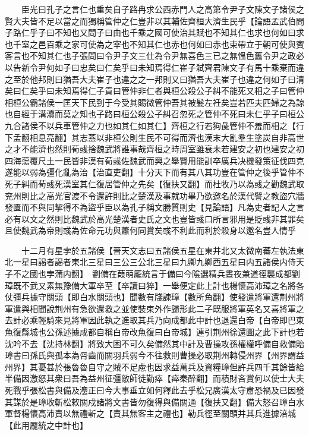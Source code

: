 　　臣光曰孔子之言仁也重矣自子路冉求公西赤門人之高第令尹子文陳文子諸侯之賢大夫皆不足以當之而獨稱管仲之仁豈非以其輔佐齊桓大濟生民乎【論語孟武伯問子路仁乎子曰不知也又問子曰由也千乘之國可使治其賦也不知其仁也求也何如曰求也千室之邑百乘之家可使為之宰也不知其仁也赤也何如曰赤也束帶立于朝可使與賓客言也不知其仁也子張問曰令尹子文三仕為令尹無喜色三已之無慍色舊令尹之政必以告新令尹何如子曰忠矣曰仁矣乎曰未知焉得仁崔子弑齊君陳文子有馬十乘棄而違之至於他邦則曰猶吾大夫崔子也違之之一邦則又曰猶吾大夫崔子也違之何如子曰清矣曰仁矣乎曰未知焉得仁子貢曰管仲非仁者與桓公殺公子糾不能死又相之子曰管仲相桓公霸諸侯一匡天下民到于今受其賜微管仲吾其被髪左衽矣豈若匹夫匹婦之為諒也自經于溝瀆而莫之知也子路曰桓公殺公子糾召忽死之管仲不死曰未仁乎子曰桓公九合諸侯不以兵車管仲之力也如其仁如其仁】齊桓之行若狗彘管仲不羞而相之【行下孟翻相息亮翻】其志蓋以非桓公則生民不可得而濟也漢末大亂羣生塗炭自非高世之才不能濟也然則荀彧捨魏武將誰事哉齊桓之時周室雖衰未若建安之初也建安之初四海蕩覆尺土一民皆非漢有荀彧佐魏武而興之舉賢用能訓卒厲兵决機發策征伐四克遂能以弱為彊化亂為治【治直吏翻】十分天下而有其八其功豈在管仲之後乎管仲不死子糾而荀彧死漢室其仁復居管仲之先矣【復扶又翻】而杜牧乃以為彧之勸魏武取兖州則比之高光官渡不令還許則比之楚漢及事就功畢乃欲邀名於漢代譬之教盜穴牆發匱而不與同挈得不為盜乎臣以為孔子稱文勝質則史【見論語】凡為史者記人之言必有以文之然則比魏武於高光楚漢者史氏之文也豈皆彧口所言邪用是貶彧非其罪矣且使魏武為帝則彧為佐命元功與蕭何同賞矣彧不利此而利於殺身以邀名豈人情乎

　　十二月有星孛於五諸侯【晉天文志曰五諸侯五星在東井北又太微南蕃左執法東北一星曰謁者謁者東北三星曰三公三公北三星曰九卿九卿西五星曰内五諸侯内侍天子不之國也孛蒲内翻】　劉備在葭萌龎統言于備曰今隂選精兵晝夜兼道徑襲成都劉璋既不武又素無豫備大軍卒至【卒讀曰猝】一舉便定此上計也楊懷高沛璋之名將各仗彊兵據守關頭【即白水關頭也】聞數有牋諫璋【數所角翻】使發遣將軍還荆州將軍遣與相聞說荆州有急欲還救之並使裝束外作歸形此二子既服將軍英名又喜將軍之去計必乘輕騎來見將軍因此執之進取其兵乃向成都此中計也退還白帝【白帝即巴東魚復縣城也公孫述據成都自稱白帝改魚復曰白帝城】連引荆州徐還圖之此下計也若沈吟不去【沈持林翻】將致大困不可久矣備然其中計及曹操攻孫權權呼備自救備貽璋書曰孫氏與孤本為脣齒而關羽兵弱今不往救則曹操必取荆州轉侵州界【州界謂益州界】其憂甚於張魯魯自守之賊不足慮也因求益萬兵及資糧璋但許兵四千其餘皆給半備因激怒其衆曰吾為益州征彊敵師徒勤瘁【瘁秦醉翻】而積財吝賞何以使士大夫死戰乎張松書與備及灋正曰今大事垂立如何釋此去乎松兄廣漢太守肅恐禍及已因發其謀於是璋收斬松敕關戍諸將文書皆勿復得與備關通【復扶又翻】備大怒召璋白水軍督楊懷高沛責以無禮斬之【責其無客主之禮也】勒兵徑至關頭并其兵進據涪城【此用龎統之中計也】

